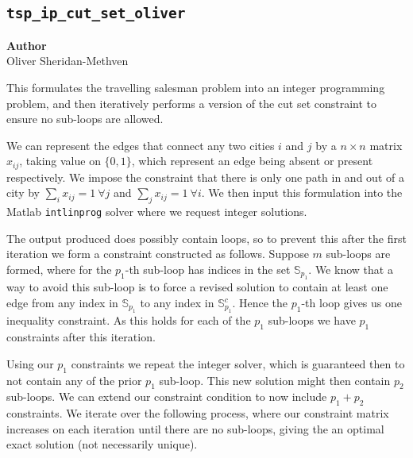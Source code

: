 \subsection{\texttt{tsp\_ip\_cut\_set\_oliver}}
\label{subsec:tsp_ip_cut_set_oliver}

\begin{flushright}
\textbf{Author} \\
Oliver Sheridan-Methven
\end{flushright}

This formulates the travelling salesman problem into an integer programming problem, and then iteratively performs a version of the cut set constraint  to ensure no sub-loops are allowed.

We can represent the edges that connect any two cities $ i $ and $ j $ by a $ n \times n $ matrix $ x_{ij} $, taking value on $ \{0, 1\} $, which represent an edge being absent or present respectively. We impose the constraint that there is only one path in and out of a city by $ \sum_{i} x_{ij} = 1 \: \forall j $ and  $ \sum_{j} x_{ij} = 1 \: \forall i $. We then input this formulation into the Matlab \verb|intlinprog| solver where we request integer solutions.

The output produced does possibly contain loops, so to prevent this after the first iteration we form a constraint constructed as follows. Suppose $ m $ sub-loops are formed, where for the $ p_1 $-th sub-loop has indices in the set $ \mathbb{S}_{p_1} $. We know that a way to avoid this sub-loop is to force a revised solution to contain at least one edge from any index in $ \mathbb{S}_{p_1} $ to any index in $ \mathbb{S}_{p_1}^c $. Hence the $ p_1 $-th loop gives us one inequality constraint. As this holds for each of the ${p_1} $ sub-loops we have ${p_1} $ constraints after this iteration.

Using our $ {p_1} $ constraints we repeat the integer solver, which is guaranteed then to not contain any of the prior $ {p_1} $ sub-loop. This new solution might then contain ${p_2} $ sub-loops. We can extend our constraint condition to now include $ p_1 + p_2 $ constraints. We iterate over the following process, where our constraint matrix increases on each iteration until there are no sub-loops, giving the an optimal exact solution (not necessarily unique).





